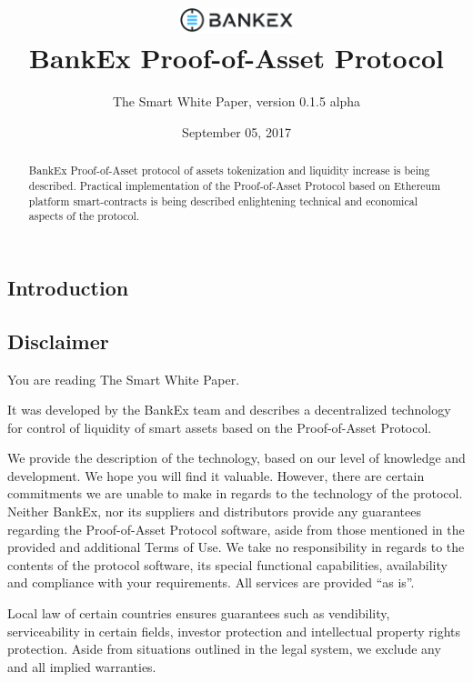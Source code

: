 \documentclass{article}
\title{\vspace{-3.85em}\includegraphics[width=0.25\textwidth]{logo.pdf} \\ \vspace{24pt} BankEx Proof-of-Asset Protocol}
\author{The Smart White Paper, version 0.1.5 alpha}
\date{September 05, 2017}
\begin{document}
\maketitle

\begin{abstract}
BankEx Proof-of-Asset protocol of assets tokenization and liquidity increase is being described. Practical implementation of the Proof-of-Asset Protocol based on Ethereum platform smart-contracts is being described enlightening technical and economical aspects of the protocol.
\end{abstract}

\vspace{24pt}

\begin{multicols}{2}

\tableofcontents

\section{Introduction}

\subsection{Disclaimer}

You are reading The Smart White Paper.

It was developed by the BankEx team and describes a decentralized technology for control of liquidity of smart assets based on the Proof-of-Asset Protocol.
	
We provide the description of the technology, based on our level of knowledge and development. We hope you will find it valuable. However, there are certain commitments we are unable to make in regards to the technology of the protocol.  
Neither BankEx, nor its suppliers and distributors provide any guarantees regarding the Proof-of-Asset Protocol software, aside from those mentioned in the provided and additional Terms of Use. We take no responsibility in regards to the contents of the protocol software, its special functional capabilities, availability and compliance with your requirements. All services are provided \enquote{as is}.

Local law of certain countries ensures guarantees such as vendibility, serviceability in certain fields, investor protection and intellectual property rights protection. Aside from situations outlined in the legal system, we exclude any and all implied warranties.


\end{multicols}
\end{document}
